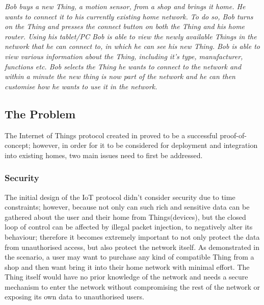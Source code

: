 \documentclass{mprop}
\begin{document}
\textit{Bob buys a new Thing, a motion sensor, from a shop and brings it home. He wants to connect it to his currently existing home network. To do so, Bob turns on the Thing and presses the connect button on both the Thing and his home router. Using his tablet/PC Bob is able to view the newly available Things in the network that he can connect to, in which he can see his new Thing. Bob is able to view various information about the Thing, including it's type, manufacturer, functions etc. Bob selects the Thing he wants to connect to the network and within a minute the new thing is now part of the network and he can then customise how he wants to use it in the network.}

\subsection{The Problem} %
\label{sub:the_problem}
The Internet of Things protocol created in \cite{KNoT} proved to be a successful proof-of-concept; however, in order for it to be considered for deployment and integration into existing homes, two main issues need to first be addressed.

\subsubsection{Security} %
\label{ssub:security}

The initial design of the IoT protocol didn't consider security due to time constraints; however, because not only can such rich and sensitive data can be gathered about the user and their home from Things(devices), but the closed loop of control can be affected by illegal packet injection, to negatively alter its behaviour; therefore it becomes extremely important to not only protect the data from unauthorised access, but also protect the network itself. As demonstrated in the scenario, a user may want to purchase any kind of compatible Thing from a shop and then want bring it into their home network with minimal effort. The Thing itself would have no prior knowledge of the network and needs a secure mechanism to enter the network without compromising the rest of the network or exposing its own data to unauthorised users. 
\end{document}
